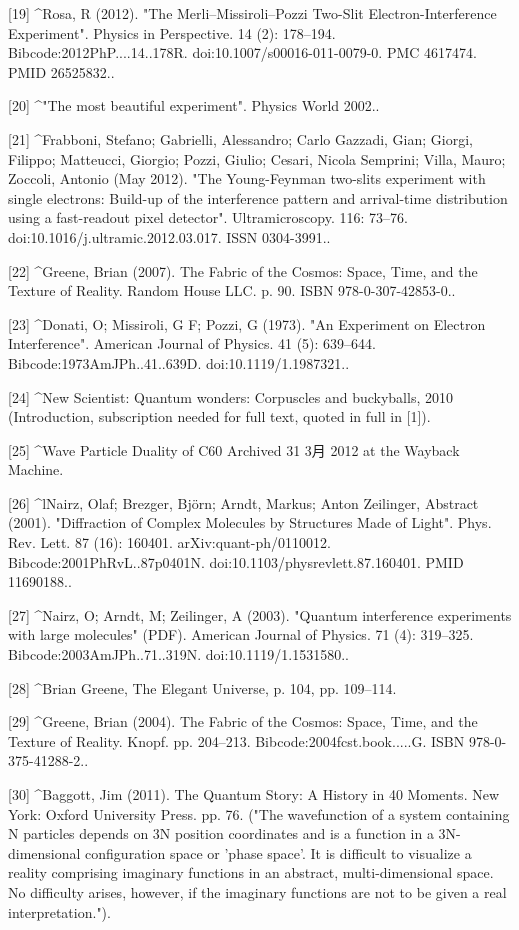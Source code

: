 [19]
^Rosa, R (2012). "The Merli–Missiroli–Pozzi Two-Slit Electron-Interference Experiment". Physics in Perspective. 14 (2): 178–194. Bibcode:2012PhP....14..178R. doi:10.1007/s00016-011-0079-0. PMC 4617474. PMID 26525832..

[20]
^"The most beautiful experiment". Physics World 2002..

[21]
^Frabboni, Stefano; Gabrielli, Alessandro; Carlo Gazzadi, Gian; Giorgi, Filippo; Matteucci, Giorgio; Pozzi, Giulio; Cesari, Nicola Semprini; Villa, Mauro; Zoccoli, Antonio (May 2012). "The Young-Feynman two-slits experiment with single electrons: Build-up of the interference pattern and arrival-time distribution using a fast-readout pixel detector". Ultramicroscopy. 116: 73–76. doi:10.1016/j.ultramic.2012.03.017. ISSN 0304-3991..

[22]
^Greene, Brian (2007). The Fabric of the Cosmos: Space, Time, and the Texture of Reality. Random House LLC. p. 90. ISBN 978-0-307-42853-0..

[23]
^Donati, O; Missiroli, G F; Pozzi, G (1973). "An Experiment on Electron Interference". American Journal of Physics. 41 (5): 639–644. Bibcode:1973AmJPh..41..639D. doi:10.1119/1.1987321..

[24]
^New Scientist: Quantum wonders: Corpuscles and buckyballs, 2010 (Introduction, subscription needed for full text, quoted in full in [1]).

[25]
^Wave Particle Duality of C60 Archived 31 3月 2012 at the Wayback Machine.

[26]
^lNairz, Olaf; Brezger, Björn; Arndt, Markus; Anton Zeilinger, Abstract (2001). "Diffraction of Complex Molecules by Structures Made of Light". Phys. Rev. Lett. 87 (16): 160401. arXiv:quant-ph/0110012. Bibcode:2001PhRvL..87p0401N. doi:10.1103/physrevlett.87.160401. PMID 11690188..

[27]
^Nairz, O; Arndt, M; Zeilinger, A (2003). "Quantum interference experiments with large molecules" (PDF). American Journal of Physics. 71 (4): 319–325. Bibcode:2003AmJPh..71..319N. doi:10.1119/1.1531580..

[28]
^Brian Greene, The Elegant Universe, p. 104, pp. 109–114.

[29]
^Greene, Brian (2004). The Fabric of the Cosmos: Space, Time, and the Texture of Reality. Knopf. pp. 204–213. Bibcode:2004fcst.book.....G. ISBN 978-0-375-41288-2..

[30]
^Baggott, Jim (2011). The Quantum Story: A History in 40 Moments. New York: Oxford University Press. pp. 76. ("The wavefunction of a system containing N particles depends on 3N position coordinates and is a function in a 3N-dimensional configuration space or 'phase space'. It is difficult to visualize a reality comprising imaginary functions in an abstract, multi-dimensional space. No difficulty arises, however, if the imaginary functions are not to be given a real interpretation.").

